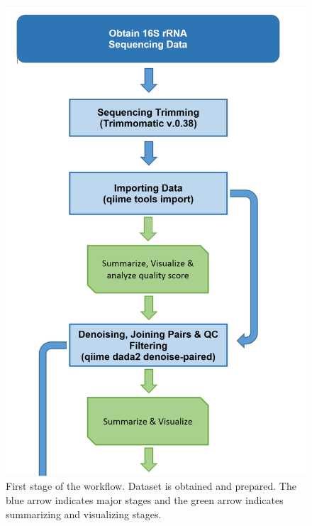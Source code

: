 \documentclass{singlecol-new}
\theoremstyle{TH}{
\newtheorem{lemma}{Lemma}
\newtheorem{theorem}[lemma]{Theorem}
\newtheorem{corrolary}[lemma]{Corrolary}
\newtheorem{conjecture}[lemma]{Conjecture}
\newtheorem{proposition}[lemma]{Proposition}
\newtheorem{claim}[lemma]{Claim}
\newtheorem{stheorem}[lemma]{Wrong Theorem}
\newtheorem{algorithm}{Algorithm}
}
\theoremstyle{THrm}{
\newtheorem{definition}{Definition}[section]
\newtheorem{question}{Question}[section]
\newtheorem{remark}{Remark}
\newtheorem{scheme}{Scheme}
}
\theoremstyle{THhit}{
\newtheorem{case}{Case}[section]
}
\begin{document}
\begin{figure}[htbp]
\centerline{\includegraphics[scale=0.3]{figures/Workflow1.png}}
\caption{First stage of the workflow. Dataset is obtained and prepared. The blue arrow indicates major stages and the green arrow indicates summarizing and visualizing stages.}
\label{fig. 1}
\end{figure}
\end{document}

